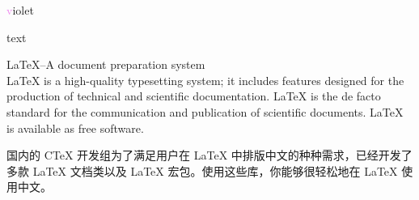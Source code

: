 \documentclass{ctexart}
\begin{document}
	
	
	\huge
		
	
	
	\yahei
	
	\color{green}
	
	{\textcolor{violet} violet}
	
	{\color{blue} text}
	
	
	{\color{-red} LaTeX–A document preparation system} \\
	
	LaTeX is a high-quality typesetting system; it includes features designed for the production of technical and scientific documentation. LaTeX is the de facto standard for the communication and publication of scientific documents. LaTeX is available as free software.
	
	国内的 CTeX 开发组为了满足用户在 LaTeX 中排版中文的种种需求，已经开发了多款 LaTeX 文档类以及 LaTeX 宏包。使用这些库，你能够很轻松地在 LaTeX 使用中文。
	
\end{document}
